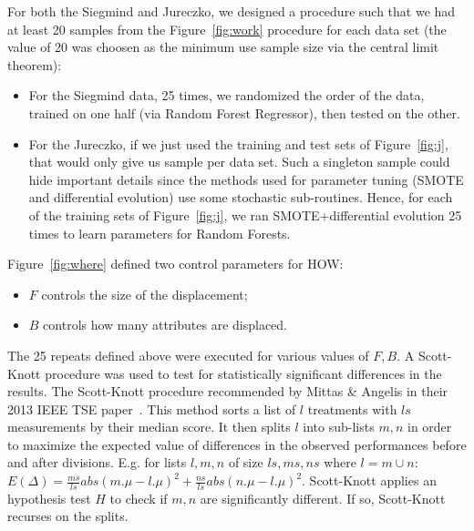 \documentclass[conference]{IEEEtran}
\newcommand{\bi}{\begin{itemize}}
\newcommand{\ei}{\end{itemize}}
\newcommand{\fig}[1]{Figure~\ref{fig:#1}}
\begin{document}
   For both the Siegmind and Jureczko, we designed a procedure such that we had at least
   20 samples from the \fig{work} procedure for  each data set (the value of 20 was choosen as the minimum use sample size via the central limit theorem):
   \bi
   \item
  For the Siegmind data, 
  25 times, 
  we randomized the order of the data, trained on one half (via
  Random Forest Regressor), then tested on the other.
  \item
  For the Jureczko, if we just  used the training and test sets of  \fig{j}, that would only
  give us sample per data set. Such a singleton sample could hide important details since the methods
  used for parameter tuning (SMOTE and differential evolution) use some stochastic sub-routines.
  Hence, for each  of the training sets of \fig{j}, we ran SMOTE+differential evolution 25 times to learn
  parameters for Random Forests.
  \ei
\fig{where} defined two control parameters for HOW:
\bi
\item  $F$   controls the size of the displacement;
\item   $B$   controls how many  attributes are displaced.
\ei
The   25 repeats defined above were executed for various values of $F,B$.
A Scott-Knott procedure was used to test for statistically significant differences in the results.
The Scott-Knott
procedure recommended by Mittas \& Angelis in their 2013
IEEE TSE paper~\cite{mittas13}.  This method
sorts a list of $l$ treatments with $ls$ measurements by their median
score. It then
splits $l$ into sub-lists $m,n$ in order to maximize the expected value of
 differences  in the observed performances
before and after divisions. E.g. for lists $l,m,n$ of size $ls,ms,ns$ where $l=m\cup n$:
 $E(\Delta)=\frac{ms}{ls}abs(m.\mu - l.\mu)^2 + \frac{ns}{ls}abs(n.\mu - l.\mu)^2$.
Scott-Knott  applies an  hypothesis test $H$ to check
if $m,n$ are significantly different. If so, Scott-Knott  recurses on the splits.
 
 

  
  

\end{document}
